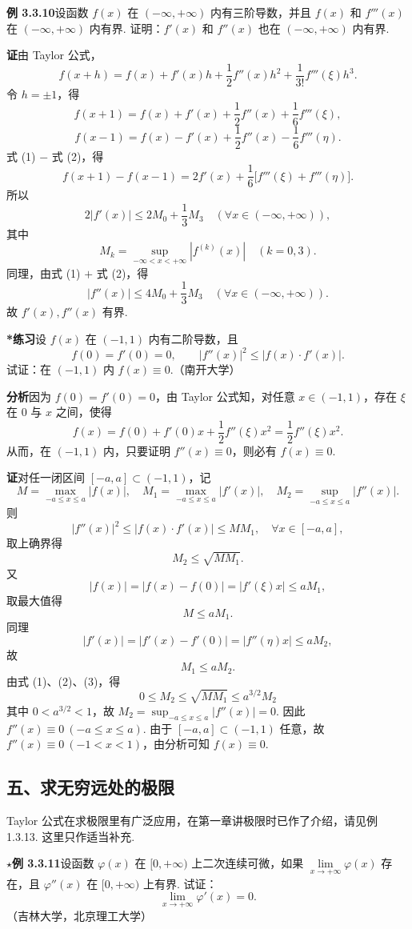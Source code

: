 \documentclass[UTF8, 12pt, fontset=fandol, oneside]{ctexart}
\begin{document}
\noindent\textbf{例 3.3.10}\quad 设函数 $f(x)$ 在 $(-\infty,+\infty)$ 内有三阶导数，并且 $f(x)$ 和 $f'''(x)$ 在 $(-\infty,+\infty)$ 内有界. 证明：$f'(x)$ 和 $f''(x)$ 也在 $(-\infty,+\infty)$ 内有界.

\noindent\textbf{证}\quad 由 Taylor 公式，
\[
  f(x+h)=f(x)+f'(x)h+\frac12f''(x)h^2+\frac{1}{3!}f'''(\xi)h^3.
\]
令 $h=\pm1$，得
\[
  f(x+1)=f(x)+f'(x)+\frac12f''(x)+\frac16f'''(\xi), \tag{1}
\]
\[
  f(x-1)=f(x)-f'(x)+\frac12f''(x)-\frac16f'''(\eta). \tag{2}
\]
式 (1) $-$ 式 (2)，得
\[
  f(x+1)-f(x-1)=2f'(x)+\frac16\bigl[f'''(\xi)+f'''(\eta)\bigr].
\]
所以
\[
  2|f'(x)|\le2M_0+\frac13M_3
  \quad(\forall x\in(-\infty,+\infty)),
\]
其中
\[
  M_k=\sup_{-\infty<x<+\infty}|f^{(k)}(x)|\quad(k=0,3).
\]
同理，由式 (1) $+$ 式 (2)，得
\[
  |f''(x)|\le4M_0+\frac13M_3
  \quad(\forall x\in(-\infty,+\infty)).
\]
故 $f'(x),f''(x)$ 有界.

\noindent\textbf{*练习}\quad 设 $f(x)$ 在 $(-1,1)$ 内有二阶导数，且
\[
  f(0)=f'(0)=0,\qquad |f''(x)|^2\le |f(x)\cdot f'(x)|.
\]
试证：在 $(-1,1)$ 内 $f(x)\equiv0$.（南开大学）

\noindent\textbf{分析}\quad 因为 $f(0)=f'(0)=0$，由 Taylor 公式知，对任意 $x\in(-1,1)$，存在 $\xi$ 在 $0$ 与 $x$ 之间，使得
\[
  f(x)=f(0)+f'(0)x+\frac12f''(\xi)x^2=\frac12f''(\xi)x^2.
\]
从而，在 $(-1,1)$ 内，只要证明 $f''(x)\equiv0$，则必有 $f(x)\equiv0$.

\noindent\textbf{证}\quad 对任一闭区间 $[-a,a]\subset(-1,1)$，记
\[
  M=\max_{-a\le x\le a}|f(x)|,\quad
  M_1=\max_{-a\le x\le a}|f'(x)|,\quad
  M_2=\sup_{-a\le x\le a}|f''(x)|.
\]
则
\[
  |f''(x)|^2\le |f(x)\cdot f'(x)|\le MM_1,\quad \forall x\in[-a,a],
\]
取上确界得
\[
  M_2\le\sqrt{MM_1}. \tag{1}
\]
又
\[
  |f(x)|=|f(x)-f(0)|=|f'(\xi)x|\le aM_1,
\]
取最大值得
\[
  M\le aM_1. \tag{2}
\]
同理
\[
  |f'(x)|=|f'(x)-f'(0)|=|f''(\eta)x|\le aM_2,
\]
故
\[
  M_1\le aM_2. \tag{3}
\]
由式 (1)、(2)、(3)，得
\[
  0\le M_2\le\sqrt{MM_1}\le a^{3/2}M_2
\]
其中 $0<a^{3/2}<1$，故 $M_2=\sup_{-a\le x\le a}|f''(x)|=0$. 因此 $f''(x)\equiv0\ (-a\le x\le a)$. 由于 $[-a,a]\subset(-1,1)$ 任意，故 $f''(x)\equiv0\ (-1<x<1)$，由分析可知 $f(x)\equiv0$.

\subsection*{五、求无穷远处的极限}

Taylor 公式在求极限里有广泛应用，在第一章讲极限时已作了介绍，请见例 1.3.13. 这里只作适当补充.

\noindent\textbf{$\star$例 3.3.11}\quad 设函数 $\varphi(x)$ 在 $[0,+\infty)$ 上二次连续可微，如果 $\lim\limits_{x\to+\infty}\varphi(x)$ 存在，且 $\varphi''(x)$ 在 $[0,+\infty)$ 上有界. 试证：
\[
  \lim_{x\to+\infty}\varphi'(x)=0.
\]
（吉林大学，北京理工大学）
\end{document}
